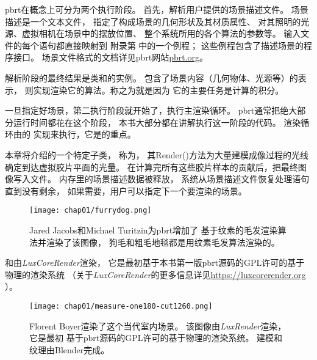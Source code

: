 pbrt在概念上可分为两个执行阶段。
首先，解析用户提供的场景描述文件。
场景描述是一个文本文件，
指定了构成场景的几何形状及其材质属性、
对其照明的光源、虚拟相机在场景中的摆放位置、
整个系统所用的各个算法的参数等。
输入文件的每个语句都直接映射到
附录第
中的一个例程；
这些例程包含了描述场景的程序接口。
场景文件格式的文档详见pbrt网站\href{https://pbrt.org/}{\ttfamily pbrt.org}。

解析阶段的最终结果是类和的实例。
包含了场景内容（几何物体、光源等）的表示，
则实现渲染它的算法。称之为就是因为
它的主要任务是计算的积分。

一旦指定好场景，第二执行阶段就开始了，执行主渲染循环。
pbrt通常把绝大部分运行时间都花在这个阶段，
本书大部分都在讲解执行这一阶段的代码。
渲染循环由的
实现来执行，它是的重点。

本章将介绍的一个特定子类，
称为，
其{\ttfamily Render()}方法为大量建模成像过程的光线
确定到达虚拟胶片平面的光量。
在计算完所有这些胶片样本的贡献后，把最终图像写入文件。
内存里的场景描述数据被释放，
系统从场景描述文件恢复处理语句直到没有剩余，
如果需要，用户可以指定下一个要渲染的场景。

\begin{figure}[htbp]
    \centering\texttt{[image: chap01/furrydog.png]}
    \caption{Jared Jacobs和Michael Turitzin为pbrt增加了
        \citet{10.1145/74333.74361}基于纹素的毛发渲染算法并渲染了该图像，
        狗毛和粗毛地毯都是用纹素毛发算法渲染的。}
    \label{fig:1.14}
\end{figure}

和由\emph{LuxCoreRender}渲染，
它是最初基于本书第一版pbrt源码的GPL许可的基于物理的渲染系统
（关于\emph{LuxCoreRender}的更多信息详见\url{https://luxcorerender.org}
）。

\begin{figure}[htbp]
    \centering\texttt{[image: chap01/measure-one180-cut1260.png]}
    \caption{Florent Boyer渲染了这个当代室内场景。
        该图像由\emph{LuxRender}渲染，它是最初
        基于pbrt源码的GPL许可的基于物理的渲染系统。
        建模和纹理由Blender完成。}
    \label{fig:1.15}
\end{figure}

